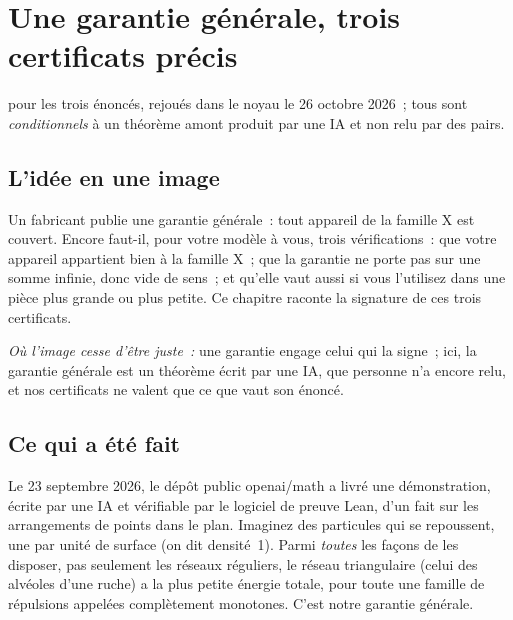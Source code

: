 \chapter[Trois certificats précis]{Une garantie générale, trois certificats précis}

\noindent{} pour les trois énoncés, rejoués dans le noyau le 26 octobre 2026~; tous sont
\emph{conditionnels} à un théorème amont produit par une IA et non relu par des pairs.

\section*{L'idée en une image}

\begin{analogie}
Un fabricant publie une garantie générale~: \og tout appareil de la famille X est couvert\fg. Encore faut-il, pour
votre modèle à vous, trois vérifications~: que votre appareil appartient bien à la famille X~; que la garantie ne
porte pas sur une somme infinie, donc vide de sens~; et qu'elle vaut aussi si vous l'utilisez dans une pièce plus
grande ou plus petite. Ce chapitre raconte la signature de ces trois certificats.

\emph{Où l'image cesse d'être juste~:} une garantie engage celui qui la signe~; ici, la \og garantie générale\fg{}
est un théorème écrit par une IA, que personne n'a encore relu, et nos certificats ne valent que ce que vaut son
énoncé.
\end{analogie}

\section*{Ce qui a été fait}

Le 23 septembre 2026, le dépôt public openai/math a livré une démonstration, écrite par une IA et vérifiable par le
logiciel de preuve Lean, d'un fait sur les arrangements de points dans le plan. Imaginez des particules qui se
repoussent, une par unité de surface (on dit \og densité~1\fg). Parmi \emph{toutes} les façons de les disposer, pas
seulement les réseaux réguliers, le réseau triangulaire (celui des alvéoles d'une ruche) a la plus petite énergie
totale, pour toute une famille de répulsions appelées \og complètement monotones\fg. C'est notre garantie générale.

